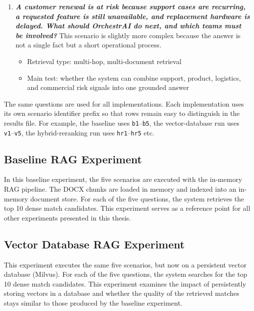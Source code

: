 \begin{enumerate}
\begin{itemize}
            \item Retrieval type: policy retrieval with exception logic
            \item Main test: whether the system can identify when a standard workflow may be bypassed
        \end{itemize}
     \item \textbf{\textit{A customer renewal is at risk because support cases are recurring, a requested feature is still unavailable, and replacement hardware is delayed. What should OrchestrAI do next, and which teams must be involved?}}\newline
     This scenario is slightly more complex because the answer is not a single fact but a short operational process.
        \begin{itemize}
            \item Retrieval type: multi-hop, multi-document retrieval
            \item Main test: whether the system can combine support, product, logistics, and commercial risk signals into one grounded answer
        \end{itemize}
\end{enumerate}

The same questions are used for all implementations. Each implementation uses its own scenario identifier prefix so that rows remain easy to distinguish in the results file. For example, the baseline uses \texttt{b1}--\texttt{b5}, the vector-database run uses \texttt{v1}--\texttt{v5}, the hybrid-reranking run uses \texttt{hr1}--\texttt{hr5} etc.

\subsection{Baseline RAG Experiment}

In this baseline experiment, the five scenarios are executed with the in-memory \ac{RAG} pipeline. The DOCX chunks are loaded in memory and indexed into an in-memory document store. For each of the five questions, the system retrieves the top 10 dense match candidates. This experiment serves as a reference point for all other experiments presented in this thesis.

\subsection{Vector Database RAG Experiment}

This experiment executes the same five scenarios, but now on a persistent vector database (Milvus). For each of the five questions, the system searches for the top 10 dense match candidates. This experiment examines the impact of persistently storing vectors in a database and whether the quality of the retrieved matches stays similar to those produced by the baseline experiment.

